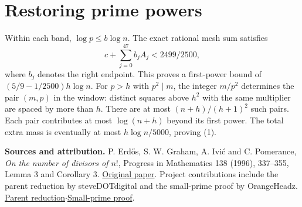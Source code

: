 \documentclass[10pt]{article}
\begin{document}
\section*{Restoring prime powers}
Within each band, $\log p\le b\log n$. The exact rational mesh sum satisfies
\[
 c+\sum_{j=0}^{47} b_j A_j<2499/2500,
\]
where $b_j$ denotes the right endpoint. This proves a first-power bound of $(5/9-1/2500)h\log n$. For $p>h$ with $p^2\mid m$, the integer $m/p^2$ determines the pair $(m,p)$ in the window: distinct squares above $h^2$ with the same multiplier are spaced by more than $h$. There are at most $(n+h)/(h+1)^2$ such pairs. Each pair contributes at most $\log(n+h)$ beyond its first power. The total extra mass is eventually at most $h\log n/5000$, proving (1).

{\small\textbf{Sources and attribution.} P. Erd\H{o}s, S. W. Graham, A. Ivi\'c and C. Pomerance, \emph{On the number of divisors of $n!$}, Progress in Mathematics 138 (1996), 337--355, Lemma 3 and Corollary 3. \href{https://math.dartmouth.edu/~carlp/factorial.pdf}{Original paper}. Project contributions include the parent reduction by steveDOTdigital and the small-prime proof by OrangeHeadz. \href{https://github.com/GuillaumeBAUD-coder/open-math-agents/pull/5169}{Parent reduction}\enspace$\cdot$\enspace\href{https://github.com/GuillaumeBAUD-coder/open-math-agents/pull/5473}{Small-prime proof}.}
\end{document}
